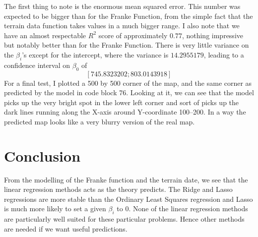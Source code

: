 \documentclass[parskip=half]{scrartcl}
\theoremstyle{definition}
\theoremstyle{remark}
\begin{document}
The first thing to note is the enormous mean squared error. 
This number was expected to be bigger than for the Franke Function, from the simple fact that the terrain data function takes values in a much bigger range. 
I also note that we have an almost respectable $R^2$ score of approximately $0.77$, nothing impressive but notably better than for the Franke Function. 
There is very little variance on the $\beta_i$'s except for the intercept, where the variance is $14.2955179$, leading to a confidence interval on $\beta_0$ of 
\[
	[745.8323202; 803.0143918]
\]
For a final test, I plotted a 500 by 500 corner of the map, and the same corner as predicted by the model in code block 76. 
Looking at it, we can see that the model picks up the very bright spot in the lower left corner and sort of picks up the dark lines running along the X-axis around Y-coordinate 100--200. 
In a way the predicted map looks like a very blurry version of the real map. 

\section{Conclusion} \label{sec:conclusion}

From the modelling of the Franke function and the terrain date, we see that the linear regression methods acts as the theory predicts.
The Ridge and Lasso regressions are more stable than the Ordinary Least Squares regression and Lasso is much more likely to set a given $\beta_i$ to $0$. 
None of the linear regression methods are particularly well suited for these particular problems. 
Hence other methods are needed if we want useful predictions. 

\newpage

\end{document}
